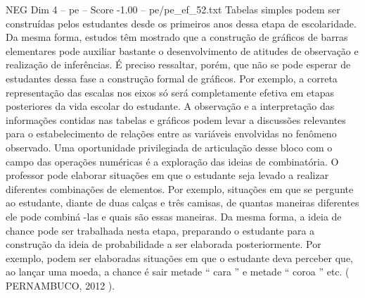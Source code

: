 \begin{textsample}{NEG Dim 4 – pe – Score -1.00 – pe/pe\_ef\_52.txt}
Tabelas simples podem ser construídas pelos estudantes desde os primeiros anos dessa etapa de escolaridade.
Da mesma forma, estudos têm mostrado que a construção de gráficos de barras elementares pode auxiliar bastante o desenvolvimento de atitudes de observação e realização de inferências.
É preciso ressaltar, porém, que não se pode esperar de estudantes dessa fase a construção formal de gráficos.
Por exemplo, a correta representação das escalas nos eixos só será completamente efetiva em etapas posteriores da vida escolar do estudante.
A observação e a interpretação das informações contidas nas tabelas e gráficos podem levar a discussões relevantes para o estabelecimento de relações entre as variáveis envolvidas no fenômeno observado.
Uma oportunidade privilegiada de articulação desse bloco com o campo das operações numéricas é a exploração das ideias de combinatória.
O professor pode elaborar situações em que o estudante seja levado a realizar diferentes combinações de elementos.
Por exemplo, situações em que se pergunte ao estudante, diante de duas calças e três camisas, de quantas maneiras diferentes ele pode combiná -las e quais são essas maneiras.
Da mesma forma, a ideia de chance pode ser trabalhada nesta etapa, preparando o estudante para a construção da ideia de probabilidade a ser elaborada posteriormente.
Por exemplo, podem ser elaboradas situações em que o estudante deva perceber que, ao lançar uma moeda, a chance é sair metade “ cara ” e metade “ coroa ” etc. ( PERNAMBUCO, 2012 ).

\end{textsample}

